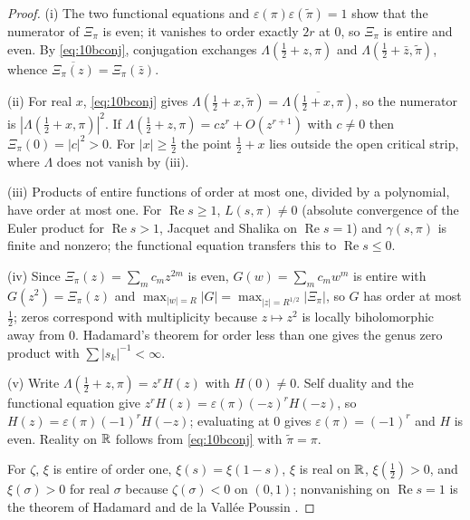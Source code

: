 \begin{proof}
(i) The two functional equations and $\varepsilon(\pi)\varepsilon(\tilde\pi)=1$ show that the numerator of $\Xi_\pi$ is even; it vanishes to order exactly $2r$ at $0$, so $\Xi_\pi$ is entire and even. By \eqref{eq:10bconj}, conjugation exchanges $\Lambda(\frac12+z,\pi)$ and $\Lambda(\frac12+\bar z,\tilde\pi)$, whence $\overline{\Xi_\pi(z)} = \Xi_\pi(\bar z)$.

(ii) For real $x$, \eqref{eq:10bconj} gives $\Lambda(\frac12+x,\tilde\pi) = \overline{\Lambda(\frac12+x,\pi)}$, so the numerator is $|\Lambda(\frac12+x,\pi)|^2$. If $\Lambda(\frac12+z,\pi) = cz^r+O(z^{r+1})$ with $c\ne0$ then $\Xi_\pi(0) = |c|^2>0$. For $|x|\ge\frac12$ the point $\frac12+x$ lies outside the open critical strip, where $\Lambda$ does not vanish by (iii).

(iii) Products of entire functions of order at most one, divided by a polynomial, have order at most one. For $\operatorname{Re}s\ge1$, $L(s,\pi)\ne0$ (absolute convergence of the Euler product for $\operatorname{Re}s>1$, Jacquet and Shalika \cite{jacquetshalika1976} on $\operatorname{Re}s=1$) and $\gamma(s,\pi)$ is finite and nonzero; the functional equation transfers this to $\operatorname{Re}s\le0$.

(iv) Since $\Xi_\pi(z) = \sum_mc_mz^{2m}$ is even, $G(w) = \sum_mc_mw^m$ is entire with $G(z^2) = \Xi_\pi(z)$ and $\max_{|w|=R}|G| = \max_{|z|=R^{1/2}}|\Xi_\pi|$, so $G$ has order at most $\frac12$; zeros correspond with multiplicity because $z\mapsto z^2$ is locally biholomorphic away from $0$. Hadamard's theorem for order less than one \cite{levin1964} gives the genus zero product with $\sum|s_k|^{-1}<\infty$.

(v) Write $\Lambda(\frac12+z,\pi) = z^rH(z)$ with $H(0)\ne0$. Self duality and the functional equation give $z^rH(z) = \varepsilon(\pi)(-z)^rH(-z)$, so $H(z) = \varepsilon(\pi)(-1)^rH(-z)$; evaluating at $0$ gives $\varepsilon(\pi)=(-1)^r$ and $H$ is even. Reality on $\mathbb{R}$ follows from \eqref{eq:10bconj} with $\tilde\pi=\pi$.

For $\zeta$, $\xi$ is entire of order one, $\xi(s) = \xi(1-s)$, $\xi$ is real on $\mathbb{R}$, $\xi(\frac12)>0$, and $\xi(\sigma)>0$ for real $\sigma$ because $\zeta(\sigma)<0$ on $(0,1)$; nonvanishing on $\operatorname{Re}s=1$ is the theorem of Hadamard and de la Vall\'ee Poussin \cite{hadamard1896,delavalleepoussin1896}.
\end{proof}

